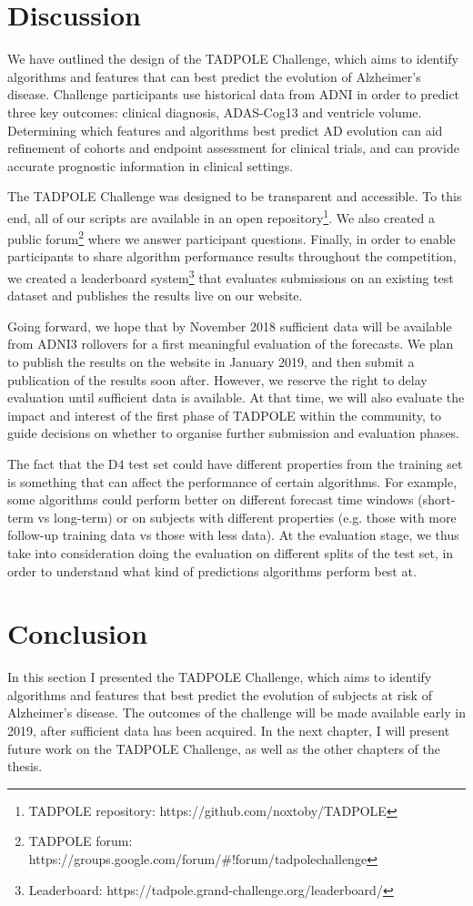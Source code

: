 \section{Discussion}

We have outlined the design of the TADPOLE Challenge, which aims to identify algorithms and features that can best predict the evolution of Alzheimer's disease. Challenge participants use historical data from ADNI in order to predict three key outcomes: clinical diagnosis, ADAS-Cog13 and ventricle volume. Determining which features and algorithms best predict AD evolution can aid refinement of cohorts and endpoint assessment for clinical trials, and can provide accurate prognostic information in clinical settings. 

The TADPOLE Challenge was designed to be transparent and accessible. To this end, all of our scripts are available in an open repository\footnote{TADPOLE repository: https://github.com/noxtoby/TADPOLE}. We also created a public forum\footnote{TADPOLE forum:  https://groups.google.com/forum/\#!forum/tadpolechallenge} where we answer participant questions. Finally, in order to enable participants to share algorithm performance results throughout the competition, we created a leaderboard system\footnote{Leaderboard: https://tadpole.grand-challenge.org/leaderboard/} that evaluates submissions on an existing test dataset and publishes the results live on our website.  

Going forward, we hope that by November 2018 sufficient data will be available from ADNI3 rollovers for a first meaningful evaluation of the forecasts. We plan to publish the results on the website in January 2019, and then submit a publication of the results soon after. However, we reserve the right to delay evaluation until sufficient data is available. At that time, we will also evaluate the impact and interest of the first phase of TADPOLE within the community, to guide decisions on whether to organise further submission and evaluation phases.

The fact that the D4 test set could have different properties from the training set is something that can affect the performance of certain algorithms. For example, some algorithms could perform better on different forecast time windows (short-term vs long-term) or on subjects with different properties (e.g. those with more follow-up training data vs those with less data). At the evaluation stage, we thus take into consideration doing the evaluation on different splits of the test set, in order to understand what kind of predictions algorithms perform best at. 

\section{Conclusion}

In this section I presented the TADPOLE Challenge, which aims to identify algorithms and features that best predict the evolution of subjects at risk of Alzheimer's disease. The outcomes of the challenge will be made available early in 2019, after sufficient data has been acquired. In the next chapter, I will present future work on the TADPOLE Challenge, as well as the other chapters of the thesis.
